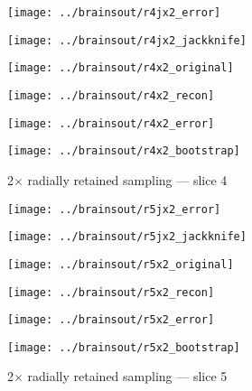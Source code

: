 \documentclass[review,supplement,onefignum,onetabnum,juq]{siamonline181217}
\begin{document}
\begin{figure}
\begin{centering}

\parbox{\imsize}{\texttt{[image: ../brainsout/r4jx2\_error]}}
\parbox{\imsize}{\texttt{[image: ../brainsout/r4jx2\_jackknife]}}

\vspace{\vertsep}

\parbox{\imsize}{\texttt{[image: ../brainsout/r4x2\_original]}}
\parbox{\imsize}{\texttt{[image: ../brainsout/r4x2\_recon]}}

\vspace{\vertsep}

\parbox{\imsize}{\texttt{[image: ../brainsout/r4x2\_error]}}
\parbox{\imsize}{\texttt{[image: ../brainsout/r4x2\_bootstrap]}}

\end{centering}
\caption{2$\times$ radially retained sampling --- slice 4}
\end{figure}


\begin{figure}
\begin{centering}

\parbox{\imsize}{\texttt{[image: ../brainsout/r5jx2\_error]}}
\parbox{\imsize}{\texttt{[image: ../brainsout/r5jx2\_jackknife]}}

\vspace{\vertsep}

\parbox{\imsize}{\texttt{[image: ../brainsout/r5x2\_original]}}
\parbox{\imsize}{\texttt{[image: ../brainsout/r5x2\_recon]}}

\vspace{\vertsep}

\parbox{\imsize}{\texttt{[image: ../brainsout/r5x2\_error]}}
\parbox{\imsize}{\texttt{[image: ../brainsout/r5x2\_bootstrap]}}

\end{centering}
\caption{2$\times$ radially retained sampling --- slice 5}
\end{figure}
\end{document}
